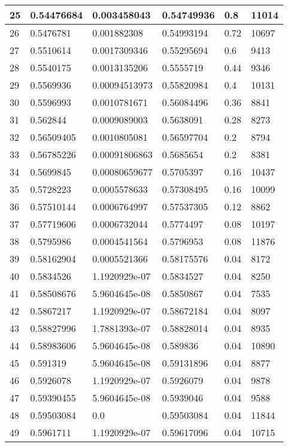 \begin{longtable}{|l|l|l|l|l|l|}
25 & 0.54476684 & 0.003458043 & 0.54749936 & 0.8 & 11014 \\ \hline 
26 & 0.5476781 & 0.001882308 & 0.54993194 & 0.72 & 10697 \\ \hline 
27 & 0.5510614 & 0.0017309346 & 0.55295694 & 0.6 & 9413 \\ \hline 
28 & 0.5540175 & 0.0013135206 & 0.5555719 & 0.44 & 9346 \\ \hline 
29 & 0.5569936 & 0.00094513973 & 0.55820984 & 0.4 & 10131 \\ \hline 
30 & 0.5596993 & 0.0010781671 & 0.56084496 & 0.36 & 8841 \\ \hline 
31 & 0.562844 & 0.0009089003 & 0.5638091 & 0.28 & 8273 \\ \hline 
32 & 0.56509405 & 0.0010805081 & 0.56597704 & 0.2 & 8794 \\ \hline 
33 & 0.56785226 & 0.00091806863 & 0.5685654 & 0.2 & 8381 \\ \hline 
34 & 0.5699845 & 0.00080659677 & 0.5705397 & 0.16 & 10437 \\ \hline 
35 & 0.5728223 & 0.0005578633 & 0.57308495 & 0.16 & 10099 \\ \hline 
36 & 0.57510144 & 0.0006764997 & 0.57537305 & 0.12 & 8862 \\ \hline 
37 & 0.57719606 & 0.0006732044 & 0.5774497 & 0.08 & 10197 \\ \hline 
38 & 0.5795986 & 0.0004541564 & 0.5796953 & 0.08 & 11876 \\ \hline 
39 & 0.58162904 & 0.0005521366 & 0.58175576 & 0.04 & 8172 \\ \hline 
40 & 0.5834526 & 1.1920929e-07 & 0.5834527 & 0.04 & 8250 \\ \hline 
41 & 0.58508676 & 5.9604645e-08 & 0.5850867 & 0.04 & 7535 \\ \hline 
42 & 0.5867217 & 1.1920929e-07 & 0.58672184 & 0.04 & 8097 \\ \hline 
43 & 0.58827996 & 1.7881393e-07 & 0.58828014 & 0.04 & 8935 \\ \hline 
44 & 0.58983606 & 5.9604645e-08 & 0.589836 & 0.04 & 10890 \\ \hline 
45 & 0.591319 & 5.9604645e-08 & 0.59131896 & 0.04 & 8877 \\ \hline 
46 & 0.5926078 & 1.1920929e-07 & 0.5926079 & 0.04 & 9878 \\ \hline 
47 & 0.59390455 & 5.9604645e-08 & 0.5939046 & 0.04 & 9588 \\ \hline 
48 & 0.59503084 & 0.0 & 0.59503084 & 0.04 & 11844 \\ \hline 
49 & 0.5961711 & 1.1920929e-07 & 0.59617096 & 0.04 & 10715 \\ \hline 

\end{longtable}
